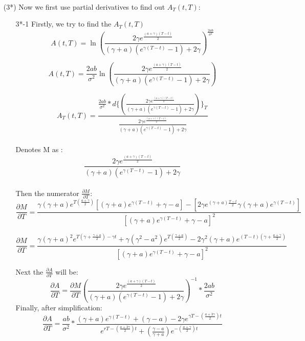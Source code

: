 \documentclass[14pt]{extarticle}
\begin{document}
~\\
\begin{itemize}
    \item [(3*)]Now we first use partial derivatives to find out $A_T(t,T) $:
    ~\\
    \begin{itemize}
        \item [3*-1] Firstly, we try to find the $A_T(t,T) $
    $$  A(t,T)=\ln({\frac{ 2\gamma e^{\frac{(a+\gamma)(T-t)}{2}} }{(\gamma+a)(e^{\gamma(T-t)}-1 ) +2\gamma    }   } )^{\frac{2ab}{\sigma^2}}$$
    
    $$ A(t,T)={\frac{2ab}{\sigma^2}}  \ln({\frac{ 2\gamma e^{\frac{(a+\gamma)(T-t)}{2}} }{(\gamma+a)(e^{\gamma(T-t)}-1 ) +2\gamma    }   } ) $$
    
    $$A_T(t,T)= \frac{\frac{2ab}{\sigma^2} *    d\{({\frac{ 2\gamma e^{\frac{(a+\gamma)(T-t)}{2}} }{(\gamma+a)(e^{\gamma(T-t)}-1 ) +2\gamma  }   })\}_T } { \frac{ 2\gamma e^{\frac{(a+\gamma)(T-t)}{2}} }{(\gamma+a)(e^{\gamma(T-t)}-1 ) +2\gamma    } }                $$
    ~\\
    Denotes M as :
    $$ \frac{ 2\gamma e^{\frac{(a+\gamma)(T-t)}{2}} }{(\gamma+a)(e^{\gamma(T-t)}-1 ) +2\gamma    } $$
    ~\\
    Then the numerator $\frac{ \partial M}{ \partial T}$:
    $$\frac{ \partial M}{ \partial T}  = \frac{\gamma(\gamma+a)e^{T( \frac{a+\gamma}{2})} [(\gamma+a)e^{\gamma(T-t)}+\gamma-a] -[2\gamma e^{(\gamma+a)\frac{T-t}{2}} \gamma(\gamma+a)e^{\gamma(T-t)}]} {[(\gamma+a)e^{\gamma(T-t)}+\gamma-a]^2  }               $$
    
    $$\frac{ \partial M}{ \partial T}  = \frac{\gamma(\gamma+a)^2 e^{T(\gamma +\frac{\gamma+a}{2} )-\gamma t}+\gamma(\gamma^2-a^2)e^{T(\frac{\gamma+a}{2})}-2\gamma^2(\gamma+a)e^{(T-t)(\gamma+\frac{a+\gamma}{2})} }    {[(\gamma+a)e^{\gamma(T-t)}+\gamma-a]^2 }  $$
    
    Next the $\frac{ \partial A}{ \partial T}$ will be:
    $$ \frac{ \partial A}{ \partial T}=\frac{ \partial M}{ \partial T} (\frac{ 2\gamma e^{\frac{(a+\gamma)(T-t)}{2}} }{(\gamma+a)(e^{\gamma(T-t)}-1 ) +2\gamma    })^{-1} * \frac{2ab}{\sigma^2}        $$
    \newpage
    Finally, after simplification:
    $$\frac{ \partial A}{ \partial T} =\frac{ab}{\sigma^2}   * \frac{(\gamma+a)e^{\gamma(T-t)}+(\gamma-a)-2\gamma e^{\gamma T-(\frac{a+3\gamma}{2})t}} {
    e^{rT-(\frac{a+3\gamma}{2})t}+(\frac{\gamma-a}{\gamma+a}) e^{-(\frac{a+\gamma}{2}) t}                }              $$

    \end{itemize}
    ~\\
    

\end{itemize}
\end{document}
